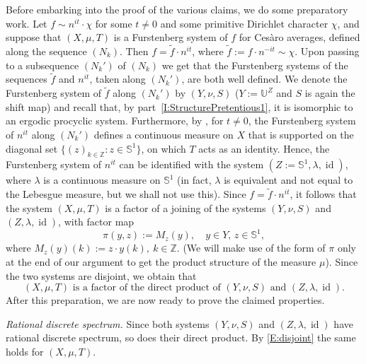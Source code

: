 \documentclass[11pt]{amsart}
\theoremstyle{definition}
\renewcommand{\S}{\mathbb{S}}
\newcommand{\Z}{{\mathbb Z}}
\newcommand{\U}{{\mathbb U}}
\DeclareMathOperator{\id}{id}
\begin{document}
  Before embarking into the proof of the various claims, we do some preparatory work.  Let $f\sim  n^{it}\cdot \chi $ for some $t\neq 0$ and some primitive Dirichlet character $\chi$, and suppose that $(X,\mu,T)$ is a Furstenberg system of $f$ for Ces\`aro  averages,  defined along the sequence $(N_k)$.
 Then $f=\tilde{f}\cdot n^{it}$, where $\tilde{f}:=f\cdot n^{-it}\sim \chi$. Upon passing to a subsequence $(N_k')$ of $(N_k)$ we get that the Furstenberg systems of the sequences $\tilde{f}$ and
  $n^{it}$, taken along $(N_k')$, are both well defined. We denote the Furstenberg system of
   $\tilde{f}$ along $(N_k')$ by $(Y,\nu,S)$ ($Y:=\U^Z$ and $S$ is again the shift map) and recall that, by part~\eqref{I:StructurePretentious1},
   it is isomorphic to an ergodic procyclic system. Furthermore, by \cite[Corollary~5.5]{GLR21}, for $t\neq 0$, the Furstenberg system of $n^{it}$ along $(N_k')$  defines a continuous measure  on $X$ that is supported on the
   diagonal set  $\{(z)_{k\in\Z}\colon z\in \S^1\}$, on which $T$ acts as an identity. Hence, the Furstenberg system of $n^{it}$ can be identified with the system $(Z:=\S^1,\lambda,\id)$, where  $\lambda$ is a continuous measure on $\S^1$ (in fact, $\lambda$ is equivalent and not equal to  the Lebesgue measure, but we shall not use this).  Since $f=\tilde{f}\cdot n^{it}$, it follows that the system $(X,\mu,T)$ is a factor of a joining of the systems
   $(Y,\nu,S)$ and $(Z,\lambda, \id)$, with factor map
   \begin{equation}\label{E:pixz}
   	  \pi(y,z):= M_z(y), \quad y\in Y,\, z\in \S^1,
   \end{equation}
     where $M_z(y)(k):=z\cdot y(k),\ k\in \Z$. (We will  make use of the form of $\pi$ only  at the end of our argument to get the product structure of the measure $\mu$). Since the two systems are disjoint, we obtain that
      \begin{equation}\label{E:disjoint}
   (X,\mu,T) \text{ is a factor of the direct product of }(Y,\nu,S) \text{ and } (Z,\lambda, \id).
   \end{equation}
After this preparation, we are now ready to prove the claimed properties.


 \smallskip

 {\em Rational discrete spectrum.}
  Since both systems $(Y,\nu,S)$ and $(Z,\lambda, \id)$ have rational discrete spectrum, so does their direct product. By \eqref{E:disjoint} the same holds for  $(X,\mu,T)$.


 \smallskip
\end{document}
